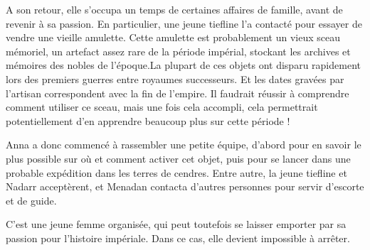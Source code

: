 \documentclass[10pt,a4paper]{article}
\begin{document}
A son retour, elle s'occupa un temps de certaines affaires de famille, avant de revenir à sa passion. En particulier, une jeune tiefline l'a contacté pour essayer de vendre une vieille amulette. Cette amulette est probablement un vieux sceau mémoriel, un artefact assez rare de la période impérial, stockant les archives et mémoires des nobles de l'époque.La plupart de ces objets ont disparu rapidement lors des premiers guerres entre royaumes successeurs. Et les dates gravées par l'artisan correspondent avec la fin de l'empire. Il faudrait réussir à comprendre comment utiliser ce sceau, mais une fois cela accompli, cela permettrait potentiellement d'en apprendre beaucoup plus sur cette période !

Anna a donc commencé à rassembler une petite équipe, d'abord pour en savoir le plus possible sur où et comment activer cet objet, puis pour se lancer dans une probable expédition dans les terres de cendres. Entre autre, la jeune tiefline et Nadarr acceptèrent, et Menadan contacta d'autres personnes pour servir d'escorte et de guide.

C'est une jeune femme organisée, qui peut toutefois se laisser emporter par sa passion pour l'histoire impériale. Dans ce cas, elle devient impossible à arrêter. 
\end{document}
